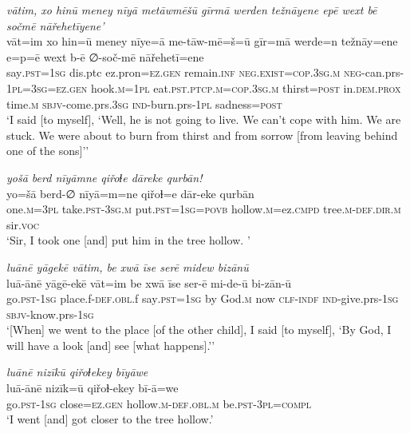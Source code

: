 \ea \label{ZQ.25}
\textit{vātim, xo hinū meney nīyā metāwmēšū gīrmā werden težnāyene epē wext bē sočmē nāřehetīyene’} \\ 
\gll vāt=im xo hin=ū meney nīye=ā me-tāw-mē=š=ū gīr=mā werde=n težnāy=ene e=p=ē wext b-ē ∅-soč-mē nāřehetī=ene \\ 
 say\textsc{.pst}\textsc{=\textsc{1sg}} dis.ptc ez.pron\textsc{=ez.gen} remain\textsc{.inf} \textsc{\textsc{neg.}exist}\textsc{=cop}\textsc{.3sg}\textsc{.m} \textsc{neg-}can.prs\textsc{-\textsc{1pl}}\textsc{=3sg}\textsc{=ez.gen} hook\textsc{.m}\textsc{=\textsc{1pl}} eat\textsc{.pst}\textsc{.ptcp}\textsc{.m}\textsc{=cop}\textsc{.3sg}\textsc{.m} thirst\textsc{=\textsc{post}} in.\textsc{dem.prox} time\textsc{.m} \textsc{sbjv-}come.prs\textsc{.3sg} \textsc{ind-}burn.prs\textsc{-\textsc{1pl}} sadness\textsc{=\textsc{post}} \\ 
\glt `I said [to myself], ‘Well, he is not going to live. We can’t cope with him. We are stuck. We were about to burn from thirst and from sorrow [from leaving behind one of the sons]’'
\z 
 
\ea \label{ZQ.26}
\textit{yošā berd nīyāmne qiřoɫe dāreke qurbān!} \\ 
\gll yo=šā berd-∅ nīyā=m=ne qiřoɫ=e dār-eke qurbān \\ 
 one\textsc{.m}\textsc{=3pl} take\textsc{.pst}\textsc{-3sg}\textsc{.m} put\textsc{.pst}\textsc{=\textsc{1sg}}\textsc{=\textsc{povb}} hollow\textsc{.m}=ez\textsc{.cmpd} tree\textsc{.m}\textsc{-def}\textsc{.dir}\textsc{.m} sir.\textsc{voc} \\ 
\glt `Sir, I took one [and] put him in the tree hollow. '
\z 
 
\ea \label{ZQ.35}
\textit{luānē yāgekē vātim, be xwā īse serē midew bizānū} \\ 
\gll luā-ānē yāgē-ekē vāt=im be xwā īse ser-ē mi-de-ū bi-zān-ū \\ 
 go\textsc{.pst}\textsc{-\textsc{1sg}} place.f\textsc{-def}\textsc{.obl}.f say\textsc{.pst}\textsc{=\textsc{1sg}} by God\textsc{.m} now \textsc{clf}\textsc{-indf} \textsc{ind-}give.prs\textsc{-\textsc{1sg}} \textsc{sbjv-}know.prs\textsc{-\textsc{1sg}} \\ 
\glt `[When] we went to the place [of the other child], I said [to myself], ‘By God, I will have a look [and] see [what happens].’'
\z 
 
\ea \label{ZQ.36}
\textit{luānē nizīkū qiřoɫekey bīyāwe} \\ 
\gll luā-ānē nizīk=ū qiřoɫ-ekey bī-ā=we \\ 
 go\textsc{.pst}\textsc{-\textsc{1sg}} close=\textsc{ez.gen} hollow\textsc{.m}\textsc{-def}\textsc{.obl}\textsc{.m} be\textsc{.pst}\textsc{-3pl}\textsc{=compl} \\ 
\glt `I went [and] got closer to the tree hollow.'
\z 
 
